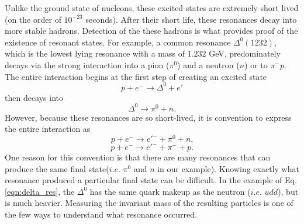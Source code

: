 Unlike the ground state of nucleons, these excited states are extremely short lived (on the order of $10^{-23}$ seconds). After their short life, these resonances decay into more stable hadrons. Detection of the these hadrons is what provides proof of the existence of resonant states. For example, a common resonance $\Delta^0(1232)$, which is the lowest lying resonance with a mass of $1.232$ GeV\cite{PDG}, predominately decays via the strong interaction into a pion ($\pi^0$) and a neutron ($n$) or to $\pi^-p$. The entire interaction begins at the first step of creating an excited state
\begin{equation}
p+e^- \longrightarrow \Delta^0 + e'
\end{equation}
then decays into
\begin{equation}
\Delta^0 \longrightarrow \pi^0 + n.
\end{equation}
However, because these resonances are so short-lived, it is convention to express the entire interaction as
\begin{equation}
\nonumber
p+e^- \longrightarrow e'^- + \pi^0 + n.
\end{equation}
\begin{equation}
\label{eqn:delta_res}
p+e^- \longrightarrow e'^- + \pi^- + p.
\end{equation}
One reason for this convention is that there are many resonances that can produce the same final state($i.e.$ $\pi^0$ and $n$ in our example). Knowing exactly what resonance produced a particular final state can be difficult. In the example of Eq. \ref{eqn:delta_res}, the $\Delta^0$ has the same quark makeup as the neutron ($i.e.$ $udd$), but is much heavier. Measuring the invariant mass of the resulting particles is one of the few ways to understand what resonance occurred. 

